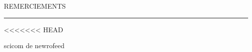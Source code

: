 \begin{center}
\MakeUppercase{\LARGE{R}\Large{emerciements}} \\
\noindent\rule{17cm}{0.4pt}
<<<<<<< HEAD
\end{center}

scicom de newrofeed

